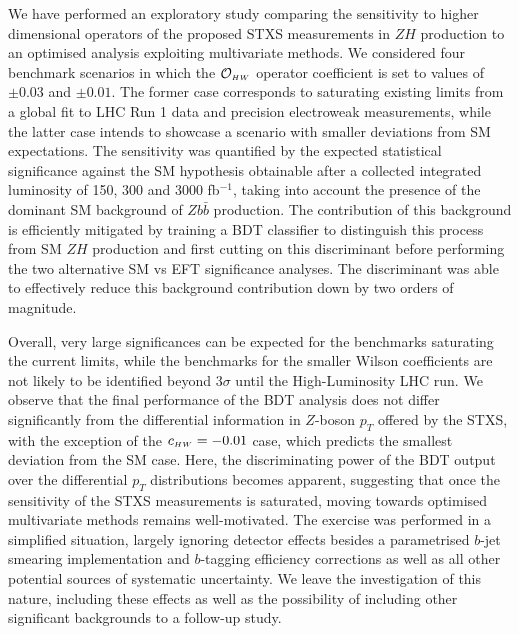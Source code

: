 We have performed an exploratory study comparing the sensitivity to higher dimensional operators of the proposed STXS measurements in $ZH$ production to an optimised analysis exploiting multivariate methods. We considered four benchmark scenarios in which the $\mathcal{O}_{\scriptscriptstyle HW}$ operator coefficient is set to values of $\pm 0.03$ and $\pm 0.01$. The former case corresponds to saturating existing limits from a global fit to LHC Run 1 data and precision electroweak measurements, while the latter case intends to showcase a scenario with smaller deviations from SM expectations. The sensitivity was quantified by the expected statistical significance against the SM hypothesis obtainable after a collected integrated luminosity of 150, 300 and 3000 fb$^{-1}$, taking into account the presence of the dominant SM background of $Zb\bar{b}$ production. The contribution of this background is efficiently mitigated by training a BDT classifier to distinguish this process from SM $ZH$ production and first cutting on this discriminant before performing the two alternative SM vs EFT significance analyses. The discriminant was able to effectively reduce this background contribution down by two orders of magnitude.

Overall, very large significances can be expected for the benchmarks saturating the current limits, while the benchmarks for the smaller Wilson coefficients are not likely to be identified beyond 3$\sigma$ until the High-Luminosity LHC run. We observe that the final performance of the BDT analysis does not differ significantly from the differential information in $Z$-boson $p_T$ offered by the STXS, with the exception of the $c_{\scriptscriptstyle HW}=-0.01$ case, which predicts the smallest deviation from the SM case. Here, the discriminating power of the BDT output over the differential $p_T$ distributions becomes apparent, suggesting that once the sensitivity of the STXS measurements is saturated, moving towards optimised multivariate methods remains well-motivated. The exercise was performed in a simplified situation, largely ignoring detector effects besides a parametrised $b$-jet smearing implementation and $b$-tagging efficiency corrections as well as all other potential sources of systematic uncertainty. We leave the investigation of this nature, including these effects as well as the possibility of including other significant backgrounds to a follow-up study. 

